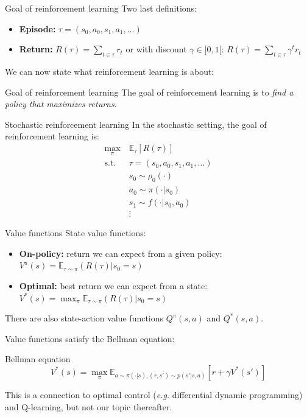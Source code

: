 \documentclass[10pt, aspectratio=1610]{beamer}
\begin{document}
\begin{frame}{Goal of reinforcement learning}
    Two last definitions:
    \begin{itemize}
        \item \textbf{Episode:} $\tau = (s_0, a_0, s_1, a_1, \ldots)$
        \item \textbf{Return:} $R(\tau) = \sum_{t \in \tau} r_t$ or with discount $\gamma \in ]0, 1[$: $R(\tau) = \sum_{t \in \tau} \gamma^t r_t$
    \end{itemize}
    We can now state what reinforcement learning is about:

    \vspace{1ex}
    \begin{block}{Goal of reinforcement learning}
        The goal of reinforcement learning is to \emph{find a policy that maximizes returns}.
    \end{block}
\end{frame}

\begin{frame}{Stochastic reinforcement learning}
    In the stochastic setting, the goal of reinforcement learning is:
    \begin{align*}
        \max_{\pi} \ & \mathbb{E}_{\tau} [R(\tau)] \\
        \mathrm{s.t.} \ & \tau = (s_0, a_0, s_1, a_1, \ldots) \\
        & s_0 \sim \rho_0(\cdot) \\
        & a_0 \sim \pi(\cdot | s_0) \\
        & s_1 \sim f(\cdot | s_0, a_0) \\
        & \vdots
    \end{align*}
\end{frame}

\begin{frame}{Value functions}
    State value functions:
    \begin{itemize}
        \item \textbf{On-policy:} return we can expect from a given policy: $V^\pi(s) = \mathbb{E}_{\tau \sim \pi}(R(\tau) | s_0 = s)$
        \item \textbf{Optimal:} best return we can expect from a state: $V^*(s) = \max_\pi \mathbb{E}_{\tau \sim \pi}(R(\tau) | s_0 = s)$
    \end{itemize}
    There are also state-action value functions $Q^\pi(s, a)$ and $Q^*(s, a)$.

    Value functions satisfy the Bellman equation:
    \begin{block}{Bellman equation}
        \[
            V^*(s) = \max_\pi \mathbb{E}_{a \sim \pi(\cdot | s), (r, s') \sim p(s' | s, a)}[r + \gamma V^*(s')]
        \]
    \end{block}
    This is a connection to optimal control (\emph{e.g.} differential dynamic programming) and Q-learning, but not our topic thereafter.
\end{frame}
\end{document}
